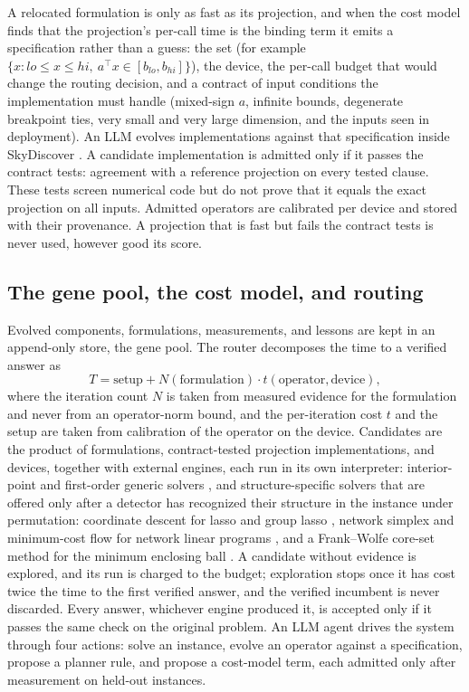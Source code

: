 A relocated formulation is only as fast as its projection, and when the cost
model finds that the projection's per-call time is the binding term it emits a
specification rather than a guess: the set (for example
$\{x : lo \le x \le hi,\ a^{\top}x \in [b_{lo}, b_{hi}]\}$), the device, the
per-call budget that would change the routing decision, and a contract of
input conditions the implementation must handle (mixed-sign $a$, infinite
bounds, degenerate breakpoint ties, very small and very large dimension, and
the inputs seen in deployment). An LLM evolves implementations against that
specification inside SkyDiscover \citep{Liu2026SkyDiscover}. A candidate
implementation is admitted only if it passes the contract tests: agreement
with a reference projection on every tested clause. These tests
screen numerical code but do not prove that it equals the exact projection
on all inputs. Admitted operators are calibrated per device and stored with
their provenance. A projection that is fast but fails the contract tests is
never used, however good its score.


\subsection{The gene pool, the cost model, and routing}

Evolved components, formulations, measurements, and lessons are kept in an
append-only store, the gene pool. The router decomposes the time to a verified
answer as
\begin{equation}
  T = \text{setup} + N(\text{formulation}) \cdot t(\text{operator}, \text{device}),
  \label{eq:costmodel}
\end{equation}
where the iteration count $N$ is taken from measured evidence for the
formulation and never from an operator-norm bound, and the per-iteration cost
$t$ and the setup are taken from calibration of the operator on the device.
Candidates are the product of formulations, contract-tested projection
implementations, and devices, together with external engines, each run in its
own interpreter: interior-point
and first-order generic solvers \citep{Goulart2024Clarabel,Schwan2023PIQP,Stellato2020OSQP,ODonoghue2016Conic,Domahidi2013ECOS,HiGHS2026Solvers,Applegate2021Practical},
and structure-specific solvers that are offered only after a detector has
recognized their structure in the instance under permutation: coordinate
descent for lasso and group lasso \citep{Massias2018Celer,Bertrand2022Beyond,Pedregosa2011Scikit},
network simplex and minimum-cost flow for network linear programs
\citep{Bonneel2011Displacement,Flamary2021POT}, and a Frank--Wolfe core-set
method for the minimum enclosing ball \citep{Yildirim2008Two,LacosteJulien2015Global}.
A candidate without evidence is explored, and its run is charged to the budget;
exploration stops once it has cost twice the time to the first verified answer,
and the verified incumbent is never discarded. Every answer, whichever engine
produced it, is accepted only if it passes the same check on the original
problem. An LLM agent drives the system through four actions: solve an
instance, evolve an operator against a specification, propose a planner rule,
and propose a cost-model term, each admitted only after measurement on held-out
instances.


